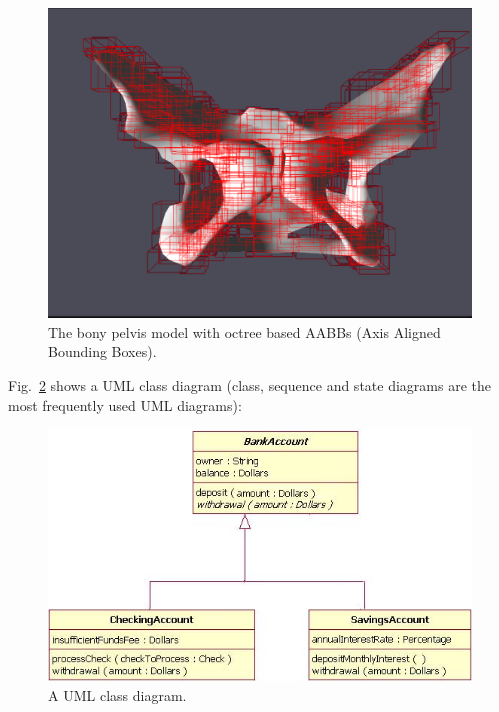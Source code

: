 \documentclass[a4paper, oneside, 11pt]{report}
\begin{document}
\begin{figure}[htb]
\includegraphics[width=1.0 \columnwidth]{pelvis_octree.png}
\caption{The bony pelvis model with octree based AABBs (Axis Aligned Bounding Boxes).}
\label{Pelvis_BVH}
\end{figure}

Fig.\ \ref{class} shows a UML class diagram (class, sequence and state diagrams are the most frequently used UML diagrams):

\begin{figure}[htb]
\includegraphics[width=1.0 \columnwidth]{class.png}
\caption{A UML class diagram.}
\label{class}
\end{figure}
\end{document}
